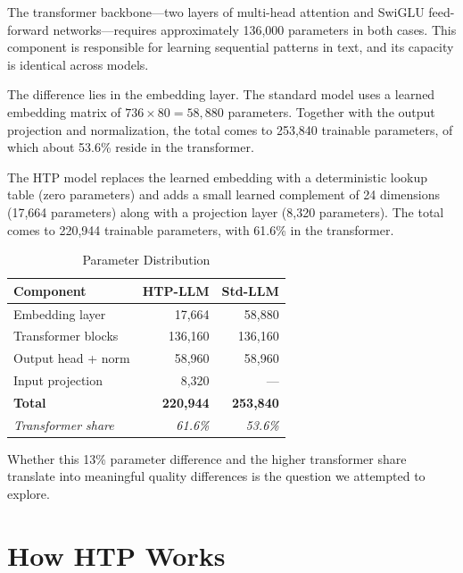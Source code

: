\documentclass[10pt,twocolumn,a4paper]{article}
\newcommand{\htpname}{HTP}
\newcommand{\htpmodel}{HTP-LLM}
\newcommand{\stdmodel}{Std-LLM}
\begin{document}
The transformer backbone---two layers of multi-head attention and SwiGLU feed-forward networks---requires approximately 136,000 parameters in both cases. This component is responsible for learning sequential patterns in text, and its capacity is identical across models.

The difference lies in the embedding layer. The standard model uses a learned embedding matrix of $736 \times 80 = 58{,}880$ parameters. Together with the output projection and normalization, the total comes to 253,840 trainable parameters, of which about 53.6\% reside in the transformer.

The \htpname{} model replaces the learned embedding with a deterministic lookup table (zero parameters) and adds a small learned complement of 24 dimensions (17,664 parameters) along with a projection layer (8,320 parameters). The total comes to 220,944 trainable parameters, with 61.6\% in the transformer.

\begin{table}[h]
\centering
\caption{Parameter Distribution}
\label{tab:params}
\begin{tabular}{lrr}
\toprule
\textbf{Component} & \textbf{\htpmodel{}} & \textbf{\stdmodel{}} \\
\midrule
Embedding layer & 17,664 & 58,880 \\
Transformer blocks & 136,160 & 136,160 \\
Output head + norm & 58,960 & 58,960 \\
Input projection & 8,320 & --- \\
\midrule
\textbf{Total} & \textbf{220,944} & \textbf{253,840} \\
\textit{Transformer share} & \textit{61.6\%} & \textit{53.6\%} \\
\bottomrule
\end{tabular}
\end{table}

Whether this 13\% parameter difference and the higher transformer share translate into meaningful quality differences is the question we attempted to explore.

\section{How HTP Works}
\label{sec:htp}
\end{document}
